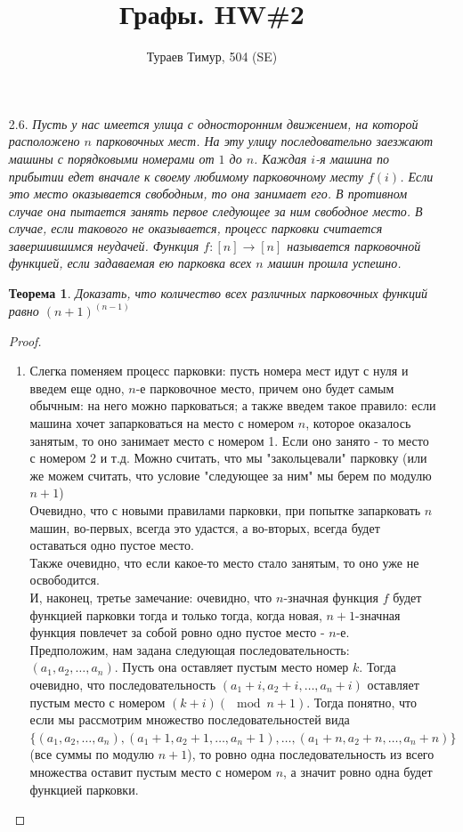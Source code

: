 \documentclass[10pt,a4paper]{article}
\begin{document}
\title{Графы. HW\#2}
\author{Тураев Тимур, 504 (SE)}
\maketitle

\begin{enumerate}
	\item[2.6.] \textit{Пусть у нас имеется улица с односторонним движением, на которой расположено $n$ парковочных мест. На эту улицу последовательно заезжают машины с порядковыми номерами от $1$ до $n$. Каждая $i$-я машина по прибытии едет вначале к своему любимому парковочному месту $f(i)$. Если это место оказывается свободным, то она занимает его. В противном случае она пытается занять первое следующее за ним свободное место. В случае, если такового не оказывается, процесс парковки считается завершившимся неудачей. Функция $f:[n] \rightarrow [n]$ называется парковочной функцией, если задаваемая ею парковка всех $n$ машин прошла успешно.}\\
	\newtheorem*{th0}{Теорема}
	\begin{th0}
	Доказать, что количество всех различных парковочных функций равно $(n+1)^{(n-1)}$
	\end{th0}
	\begin{proof}
	\begin{enumerate}
	\item Слегка поменяем процесс парковки: пусть номера мест идут с нуля и введем еще одно, $n$-е парковочное место, причем оно будет самым обычным: на него можно парковаться; а также введем такое правило: если машина хочет запарковаться на место с номером $n$, которое оказалось занятым, то оно занимает место с номером 1. Если оно занято - то место с номером 2 и т.д. Можно считать, что мы "закольцевали" парковку (или же можем считать, что условие "следующее за ним" мы берем по модулю $n+1$)\\
	Очевидно, что с новыми правилами парковки, при попытке запарковать $n$ машин, во-первых, всегда это удастся, а во-вторых, всегда будет оставаться одно пустое место.\\
	Также очевидно, что если какое-то место стало занятым, то оно уже не освободится.\\
	И, наконец, третье замечание: очевидно, что $n$-значная функция $f$ будет функцией парковки тогда и только тогда, когда новая, $n+1$-значная функция повлечет за собой ровно одно пустое место - $n$-е.\\
	Предположим, нам задана следующая последовательность: $(a_1, a_2, \ldots, a_n)$. Пусть она оставляет пустым место номер $k$. Тогда очевидно, что последовательность $(a_1+i, a_2+i, \ldots, a_n+i)$ оставляет пустым место с номером $(k+i)(\mod {n+1})$. Тогда понятно, что если мы рассмотрим множество последовательностей вида $\{(a_1, a_2, \ldots, a_n), (a_1+1, a_2+1, \ldots, a_n+1), \ldots, (a_1+n, a_2+n, \ldots, a_n+n)\}$ (все суммы по модулю $n+1$), то ровно одна последовательность из всего множества оставит пустым место с номером $n$, а значит ровно одна будет функцией парковки.\\

\end{enumerate}
\end{proof}
\end{enumerate}
\end{document}

